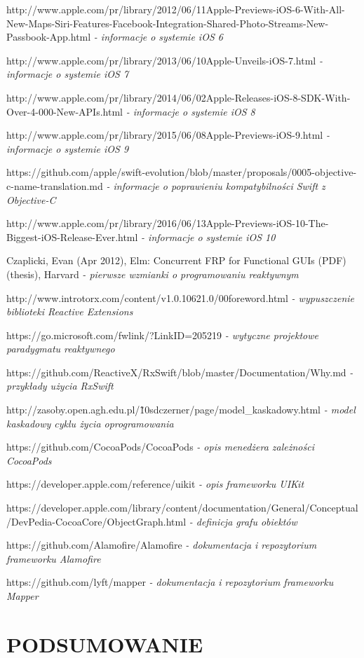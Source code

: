 \documentclass[12pt,oneside,a4paper]{report}
\begin{document}
\begin{thebibliography}{50}
http://www.apple.com/pr/library/2012/06/11Apple-Previews-iOS-6-With-All-New-Maps-Siri-Features-Facebook-Integration-Shared-Photo-Streams-New-Passbook-App.html
\emph{ - informacje o systemie iOS 6}

http://www.apple.com/pr/library/2013/06/10Apple-Unveils-iOS-7.html
\emph{ - informacje o systemie iOS 7}

http://www.apple.com/pr/library/2014/06/02Apple-Releases-iOS-8-SDK-With-Over-4-000-New-APIs.html
\emph{ - informacje o systemie iOS 8}

http://www.apple.com/pr/library/2015/06/08Apple-Previews-iOS-9.html
\emph{ - informacje o systemie iOS 9}

https://github.com/apple/swift-evolution/blob/master/proposals/0005-objective-c-name-translation.md
\emph{ - informacje o poprawieniu kompatybilności Swift z Objective-C}

http://www.apple.com/pr/library/2016/06/13Apple-Previews-iOS-10-The-Biggest-iOS-Release-Ever.html
\emph{ - informacje o systemie iOS 10}

 Czaplicki, Evan (Apr 2012), Elm: Concurrent FRP for Functional GUIs (PDF) (thesis), Harvard
\emph{ - pierwsze wzmianki o programowaniu reaktywnym}

 http://www.introtorx.com/content/v1.0.10621.0/00foreword.html
\emph{ - wypuszczenie biblioteki Reactive Extensions}

 https://go.microsoft.com/fwlink/?LinkID=205219
\emph{ - wytyczne projektowe paradygmatu reaktywnego}

https://github.com/ReactiveX/RxSwift/blob/master/Documentation/Why.md
\emph{ - przykłady użycia RxSwift}

 http://zasoby.open.agh.edu.pl/\~10sdczerner/page/model\_kaskadowy.html
\emph{ - model kaskadowy cyklu życia oprogramowania}

 https://github.com/CocoaPods/CocoaPods
\emph{ - opis menedżera zależności CocoaPods}

https://developer.apple.com/reference/uikit
\emph{ - opis frameworku UIKit}

 https://developer.apple.com/library/content/documentation/General/Conceptual/DevPedia-CocoaCore/ObjectGraph.html
\emph{ - definicja grafu obiektów}

https://github.com/Alamofire/Alamofire
\emph{ - dokumentacja i repozytorium frameworku Alamofire}

https://github.com/lyft/mapper
\emph{ - dokumentacja i repozytorium frameworku Mapper}
\end{thebibliography}
\chapter{PODSUMOWANIE}
\end{document}
